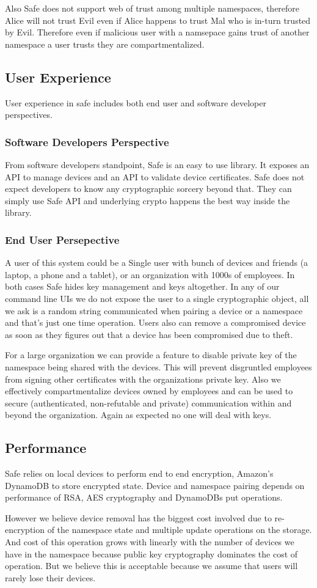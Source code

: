 Also Safe does not support web of trust among multiple namespaces, therefore Alice will not trust Evil even if Alice happens to trust Mal who is in-turn trusted by Evil. Therefore even if malicious user with a namsepace gains trust of another namespace a user trusts they are compartmentalized.


\subsection{User Experience}
User experience in safe includes both end user and software developer perspectives. 

\subsubsection{Software Developers Perspective}
From software developers standpoint, Safe is an easy to use library. It exposes an API to manage devices and an API to validate device certificates. Safe does not expect developers to  know any cryptographic sorcery beyond that. They can simply use Safe API and underlying crypto happens the best way inside the library.

\subsubsection{End User Persepective}
A user of this system could be a Single user with bunch of devices and friends (a laptop, a phone and a tablet), or an organization with 1000s of employees. In both cases Safe hides key management and keys altogether. In any of our command line UIs we do not expose the user to a single cryptographic object, all we ask is a random string communicated when pairing a device or a namespace and that's just one time operation. Users also can remove a compromised device as soon as they figures out that a device has been compromised due to theft.

For a large organization we can provide a feature to disable private key of the namespace being shared with the devices. This will prevent disgruntled employees from signing other certificates with the organizations private key. Also we effectively compartmentalize devices owned by employees and can be used to secure (authenticated, non-refutable and private) communication within and beyond the organization. Again as expected no one will deal with keys.

\subsection{Performance}
Safe relies on local devices to perform end to end encryption, Amazon's DynamoDB to store encrypted state. Device and namespace pairing depends on performance of RSA, AES cryptography and DynamoDBs put operations. 

However we believe device removal has the biggest cost involved due to re-encryption of the namespace state and multiple update operations on the storage. And cost of this operation grows with linearly with the number of devices we have in the namespace because public key cryptography dominates the cost of operation. But we believe this is acceptable because we assume that users will rarely lose their devices.
